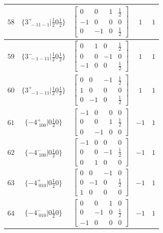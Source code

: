 \documentclass[fleqn,8pt]{jsarticle}
\begin{document}
\begin{longtable}{ccccc}
$ 58 $ & $ \{3^{+}_{\,\,-11-1}|\frac{1}{2} 0 \frac{1}{2}\} $ & $ \begin{bmatrix} 0 & 0 & 1 & \frac{1}{2} \\ -1 & 0 & 0 & 0 \\ 0 & -1 & 0 & \frac{1}{2} \end{bmatrix} $ & $ 1 $ & $ 1 $ \\ \hline
$ 59 $ & $ \{3^{-}_{\,\,-1-11}|\frac{1}{2} 0 \frac{1}{2}\} $ & $ \begin{bmatrix} 0 & 1 & 0 & \frac{1}{2} \\ 0 & 0 & -1 & 0 \\ -1 & 0 & 0 & \frac{1}{2} \end{bmatrix} $ & $ 1 $ & $ 1 $ \\ \hline
$ 60 $ & $ \{3^{+}_{\,\,-1-11}|\frac{1}{2} 0 \frac{1}{2}\} $ & $ \begin{bmatrix} 0 & 0 & -1 & \frac{1}{2} \\ 1 & 0 & 0 & 0 \\ 0 & -1 & 0 & \frac{1}{2} \end{bmatrix} $ & $ 1 $ & $ 1 $ \\ \hline
$ 61 $ & $ \{-4^{+}_{\,\,100}|0 \frac{1}{2} 0\} $ & $ \begin{bmatrix} -1 & 0 & 0 & 0 \\ 0 & 0 & 1 & \frac{1}{2} \\ 0 & -1 & 0 & 0 \end{bmatrix} $ & $ -1 $ & $ 1 $ \\ \hline
$ 62 $ & $ \{-4^{-}_{\,\,100}|0 \frac{1}{2} 0\} $ & $ \begin{bmatrix} -1 & 0 & 0 & 0 \\ 0 & 0 & -1 & \frac{1}{2} \\ 0 & 1 & 0 & 0 \end{bmatrix} $ & $ -1 $ & $ 1 $ \\ \hline
$ 63 $ & $ \{-4^{+}_{\,\,010}|0 \frac{1}{2} 0\} $ & $ \begin{bmatrix} 0 & 0 & -1 & 0 \\ 0 & -1 & 0 & \frac{1}{2} \\ 1 & 0 & 0 & 0 \end{bmatrix} $ & $ -1 $ & $ 1 $ \\ \hline
$ 64 $ & $ \{-4^{-}_{\,\,010}|0 \frac{1}{2} 0\} $ & $ \begin{bmatrix} 0 & 0 & 1 & 0 \\ 0 & -1 & 0 & \frac{1}{2} \\ -1 & 0 & 0 & 0 \end{bmatrix} $ & $ -1 $ & $ 1 $ \\ \hline

\end{longtable}
\end{document}
